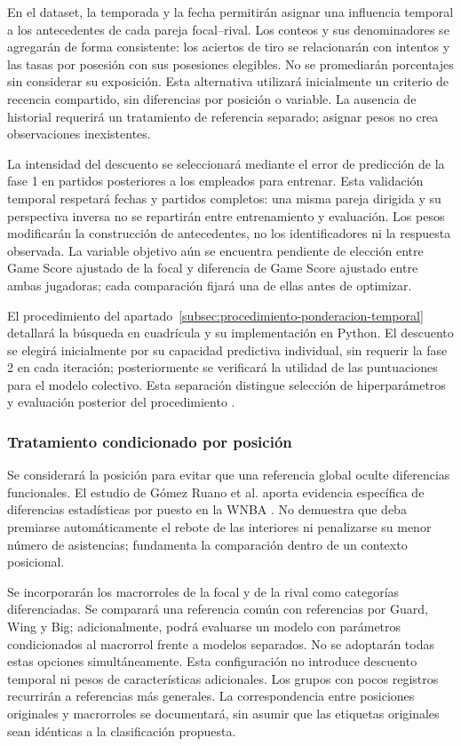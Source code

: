 En el dataset, la temporada y la fecha permitirán asignar una influencia temporal a los antecedentes de cada pareja focal--rival. Los conteos y sus denominadores se agregarán de forma consistente: los aciertos de tiro se relacionarán con intentos y las tasas por posesión con sus posesiones elegibles. No se promediarán porcentajes sin considerar su exposición. Esta alternativa utilizará inicialmente un criterio de recencia compartido, sin diferencias por posición o variable. La ausencia de historial requerirá un tratamiento de referencia separado; asignar pesos no crea observaciones inexistentes.

La intensidad del descuento se seleccionará mediante el error de predicción de la fase 1 en partidos posteriores a los empleados para entrenar. Esta validación temporal respetará fechas y partidos completos: una misma pareja dirigida y su perspectiva inversa no se repartirán entre entrenamiento y evaluación. Los pesos modificarán la construcción de antecedentes, no los identificadores ni la respuesta observada. La variable objetivo aún se encuentra pendiente de elección entre Game Score ajustado de la focal y diferencia de Game Score ajustado entre ambas jugadoras; cada comparación fijará una de ellas antes de optimizar.

El procedimiento del apartado~\ref{subsec:procedimiento-ponderacion-temporal} detallará la búsqueda en cuadrícula y su implementación en Python. El descuento se elegirá inicialmente por su capacidad predictiva individual, sin requerir la fase 2 en cada iteración; posteriormente se verificará la utilidad de las puntuaciones para el modelo colectivo. Esta separación distingue selección de hiperparámetros y evaluación posterior del procedimiento \cite{sklearnSearch613,cawley2010selection}.

\subsubsection{Tratamiento condicionado por posición}
\label{subsubsec:ponderacion-posicion}
Se considerará la posición para evitar que una referencia global oculte diferencias funcionales. El estudio de Gómez Ruano et al. aporta evidencia específica de diferencias estadísticas por puesto en la WNBA \cite{gomez2007posicioneswnba}. No demuestra que deba premiarse automáticamente el rebote de las interiores ni penalizarse su menor número de asistencias; fundamenta la comparación dentro de un contexto posicional.

Se incorporarán los macrorroles de la focal y de la rival como categorías diferenciadas. Se comparará una referencia común con referencias por Guard, Wing y Big; adicionalmente, podrá evaluarse un modelo con parámetros condicionados al macrorrol frente a modelos separados. No se adoptarán todas estas opciones simultáneamente. Esta configuración no introduce descuento temporal ni pesos de características adicionales. Los grupos con pocos registros recurrirán a referencias más generales. La correspondencia entre posiciones originales y macrorroles se documentará, sin asumir que las etiquetas originales sean idénticas a la clasificación propuesta.

